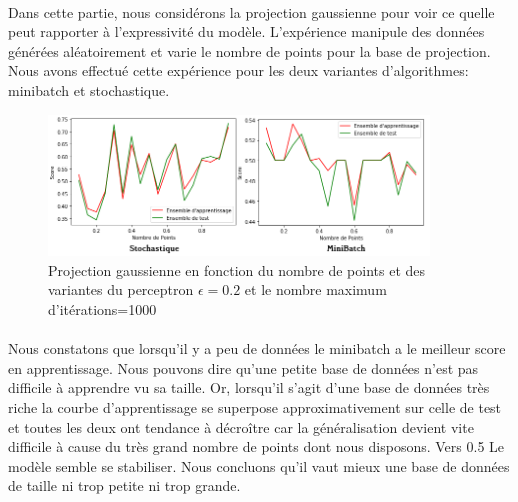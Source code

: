 \documentclass{report}
\begin{document}
\paragraph{}
Dans cette partie, nous considérons la projection gaussienne pour voir ce quelle peut rapporter à l'expressivité du modèle. L'expérience manipule des données générées aléatoirement et varie le nombre de points pour la base de projection. Nous avons effectué cette expérience pour les deux variantes d'algorithmes: minibatch et stochastique.  
 \begin{figure}[H]
	\begin{center}
		\includegraphics[width=0.9\textwidth]{gauss_nb.png}
		\caption{Projection gaussienne en fonction du nombre de points et des variantes du perceptron $\epsilon=0.2$ et le nombre maximum d'itérations=1000}
	\end{center}
\end{figure}
\paragraph{}
Nous constatons que lorsqu'il y a peu de données le minibatch a le meilleur score en apprentissage. Nous pouvons dire qu'une petite base de données n'est pas difficile à apprendre vu sa taille. Or, lorsqu'il s'agit d'une base de données très riche la courbe d'apprentissage se superpose approximativement sur celle de test et toutes les deux ont tendance à décroître car la généralisation devient vite difficile à cause du  très grand nombre de points dont nous disposons. Vers 0.5 Le modèle semble se stabiliser. Nous concluons qu'il vaut mieux une base de données de taille ni trop petite ni trop grande. 
\end{document}
